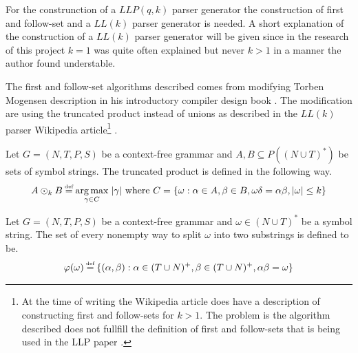 For the construnction of a $LLP(q,k)$ parser generator the construction of first and follow-set \cite[p. 5]{Vagner2007} and a $LL(k)$ parser generator is needed. A short explanation of the construction of a $LL(k)$ parser generator will be given since in the research of this project $k = 1$ was quite often explained but never $k > 1$ in a manner the author found understable.

The first and follow-set algorithms described comes from modifying Torben Mogensen description in his introductory compiler design book \cite[p. 55-65]{Mogensen}. The modification are using the truncated product instead of unions as described in the $LL(k)$ parser Wikipedia article\footnote{At the time of writing the Wikipedia article does have a description of constructing first and follow-sets for $k > 1$. The problem is the algorithm described does not fullfill the definition of first and follow-sets that is being used in the LLP paper \cite[p. 5]{Vagner2007}.} \cite{wiki:LL_parser}.

\begin{definition}
    Let $G = (N, T, P, S)$ be a context-free grammar and $A, B \subseteq P((N \cup T)^*)$ be sets of symbol strings. The truncated product is defined in the following way.
    \begin{gather*}
        A \odot_k B \defeq \underset{\gamma \in C}{\arg \max} \; |\gamma| \text{ where } C = \{\omega : \alpha \in A, \beta \in B, \omega\delta = \alpha\beta, |\omega| \leq k\}
    \end{gather*}
\end{definition}

\begin{definition}
    Let $G = (N, T, P, S)$ be a context-free grammar and $\omega \in (N \cup T)^*$ be a symbol string. The set of every nonempty way to split $\omega$ into two substrings is defined to be.
    \begin{gather*}
        \varphi(\omega) \defeq \{(\alpha, \beta) : \alpha \in (T \cup N)^+, \beta \in (T \cup N)^+, \alpha\beta = \omega\}
    \end{gather*}
\end{definition}

